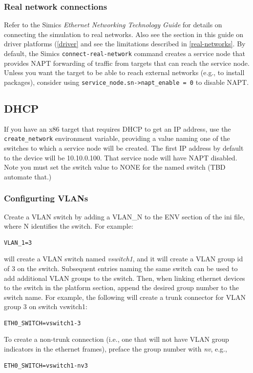 \documentclass[titlepage]{article}
\begin{document}
\subsubsection{Real network connections}
Refer to the Simics \textit{Ethernet Networking Technology Guide} for details on connecting the simulation to real networks.
Also see the section in this guide on driver platforms (\ref{driver} and see the limitations described in \ref{real-networks}.  
By default, the Simics {\tt connect-real-network} command creates a service
node that provides NAPT forwarding of traffic from targets that can reach the service node.  Unless you want the target to be able to
reach external networks (e.g., to install packages), consider using {\tt service\_node.sn->napt\_enable = 0} to disable NAPT.

\subsection{DHCP}
\label{DHCP}
If you have an x86 target that requires DHCP to get an IP address, use the {\tt create\_network} environment variable, providing a value
naming one of the switches to which a service node will be created.  The first IP address by default to the device will be 10.10.0.100.
That service node will have NAPT disabled.  Note you must set the switch value to NONE for the named switch (TBD automate that.)

\subsubsection{Configurting VLANs}
Create a VLAN switch by adding a {VLAN\_N} to the ENV section of the ini file, where N identifies the switch.  For example:
\begin{verbatim}
VLAN_1=3
\end{verbatim}
\noindent will create a VLAN switch named \textit{vswitch1}, and it will create a VLAN group id of 3 on the switch.  Subsequent entries naming the same switch
can be used to add additional VLAN groups to the switch.  Then, when linking ethernet devices to the switch in the platform section, append the desired group 
number to the switch name.  For example, the following will create a trunk connector for VLAN group 3 on switch vswitch1:
\begin{verbatim}
ETH0_SWITCH=vswitch1-3
\end{verbatim}
\noindent To create a non-trunk connection (i.e., one that will not have VLAN group indicators in the ethernet frames), preface the group number with 
\textit{nv}, e.g.,
\begin{verbatim}
ETH0_SWITCH=vswitch1-nv3
\end{verbatim}
\end{document}
